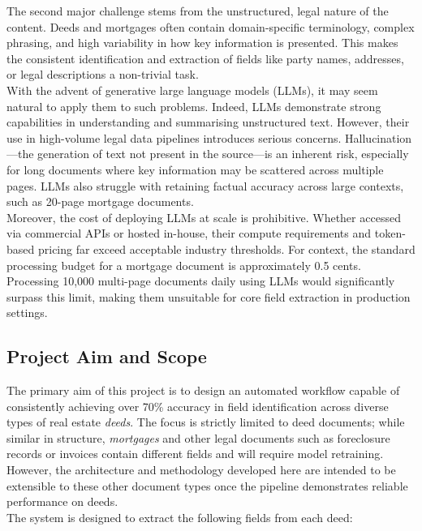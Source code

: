 \documentclass{article}
\begin{document}
The second major challenge stems from the unstructured, legal nature of the content. Deeds and mortgages often contain domain-specific terminology, complex phrasing, and high variability in how key information is presented. This makes the consistent identification and extraction of fields like party names, addresses, or legal descriptions a non-trivial task. \\

With the advent of generative large language models (LLMs), it may seem natural to apply them to such problems. Indeed, LLMs demonstrate strong capabilities in understanding and summarising unstructured text. However, their use in high-volume legal data pipelines introduces serious concerns. Hallucination—the generation of text not present in the source—is an inherent risk, especially for long documents where key information may be scattered across multiple pages. LLMs also struggle with retaining factual accuracy across large contexts, such as 20-page mortgage documents. \\

Moreover, the cost of deploying LLMs at scale is prohibitive. Whether accessed via commercial APIs or hosted in-house, their compute requirements and token-based pricing far exceed acceptable industry thresholds. For context, the standard processing budget for a mortgage document is approximately 0.5 cents. Processing 10,000 multi-page documents daily using LLMs would significantly surpass this limit, making them unsuitable for core field extraction in production settings. \\

\subsection{Project Aim and Scope}

The primary aim of this project is to design an automated workflow capable of consistently achieving over 70\% accuracy in field identification across diverse types of real estate \textit{deeds}. The focus is strictly limited to deed documents; while similar in structure, \textit{mortgages} and other legal documents such as foreclosure records or invoices contain different fields and will require model retraining. However, the architecture and methodology developed here are intended to be extensible to these other document types once the pipeline demonstrates reliable performance on deeds. \\

The system is designed to extract the following fields from each deed:
\end{document}
